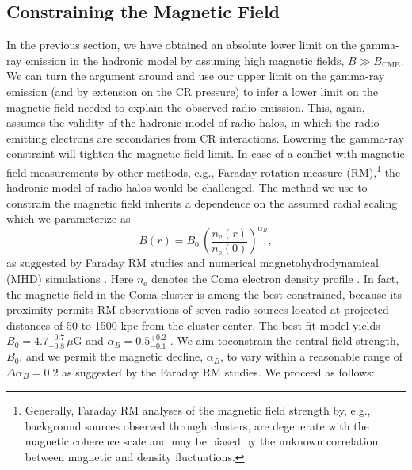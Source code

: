 \documentclass[12pt,manuscript]{aastex}
\newcommand{\rmn}{\mathrm}
\begin{document}
\subsection{Constraining the Magnetic Field}
\label{sec:B}
In the previous section, we have obtained an absolute lower limit on the gamma-ray emission in
the hadronic model by assuming high magnetic fields, $B\gg B_\rmn{CMB}$. We can turn the
argument around and use our upper limit on the gamma-ray emission (and by extension on the
CR pressure) to infer a lower limit on the magnetic field needed to explain the observed radio
emission. This, again, assumes the validity of the hadronic model of radio halos, in which the
radio-emitting electrons are secondaries from CR interactions. Lowering the gamma-ray
constraint will tighten the magnetic field limit. In case of a conflict with magnetic field
measurements by other methods, e.g., Faraday rotation measure (RM),\footnote{Generally,
Faraday RM analyses of the magnetic field strength by, e.g., background sources observed through
clusters, are degenerate with the magnetic coherence scale and may be biased by the unknown
correlation between magnetic and density fluctuations.} the hadronic model of radio halos would
be challenged. The method we use to constrain the magnetic field inherits a dependence on
the assumed radial scaling which we parameterize as
\begin{equation}
\label{eq:B}
B(r) = B_{0} \,\left(\frac{n_{\rmn{e}}(r)}{n_{\rmn{e}}(0)}\right)^{\alpha_B},
\end{equation}
as suggested by Faraday RM studies and numerical magnetohydrodynamical (MHD) simulations
\citep[][and references therein]{article:Bonafede_etal:2010, article:Bonafede_etal:2011}. Here
$n_{\rmn{e}}$ denotes the Coma electron density profile \citep{article:BrielHenryBohringer:1992}.
In fact, the magnetic field in the Coma cluster is among the best constrained, because its proximity
permits RM observations of seven radio sources located at projected distances of 50 to 1500 kpc from
the cluster center. The best-fit model yields $B_{0} = 4.7^{+0.7}_{-0.8}\,\mu$G and $\alpha_{B} =
0.5^{+0.2}_{-0.1}$ \citep{article:Bonafede_etal:2010}. We aim toconstrain the central field
strength, $B_{0}$, and we permit the magnetic decline, $\alpha_{B}$, to vary within a reasonable
range of $\Delta\alpha_{B}=0.2$ as suggested by the Faraday RM studies. We proceed as follows:
\end{document}
